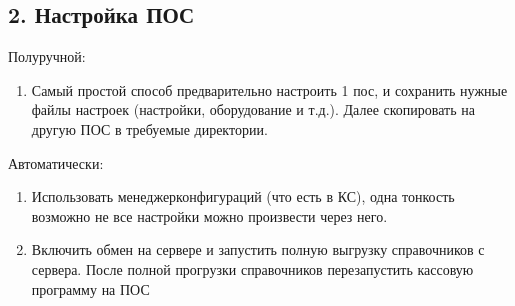 \documentclass[letterpaper,10pt,russian]{sphinxmanual}
\begin{document}
\subsection{2. Настройка ПОС}
\label{\detokenize{kass:id3}}
\sphinxAtStartPar
Полуручной:
\begin{enumerate}
%
\item {} 
\sphinxAtStartPar
Самый простой способ предварительно настроить 1 пос, и сохранить нужные файлы настроек (настройки, оборудование и т.д.). Далее скопировать на другую ПОС в требуемые директории.

\end{enumerate}

\sphinxAtStartPar
Автоматически:
\begin{enumerate}
%
\item {} 
\sphinxAtStartPar
Использовать менеджер\sphinxhyphen{}конфигураций (что есть в КС), одна тонкость \sphinxhyphen{} возможно не все настройки можно произвести через него.

\item {} 
\sphinxAtStartPar
Включить обмен на сервере и запустить полную выгрузку справочников с сервера. После полной прогрузки справочников \sphinxhyphen{} перезапустить кассовую программу на ПОС

\end{enumerate}

\sphinxstepscope
\end{document}
